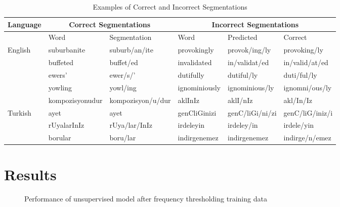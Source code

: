 \documentclass[11pt,twocolumn]{article}
\newcommand\engsmallw{2514}
\newcommand\engmedw{48146}
\newcommand\englargew{126537}
\newcommand\tursmallw{1592}
\newcommand\turmedw{14909}
\newcommand\turlargew{89023}
\begin{document}
\begin{table*}
    \begin{center}
        \begin{tabular}{ | l | l | l | l | l | l |}
            \hline
            Language & \multicolumn{2}{|c|}{\textbf{Correct Segmentations}} & \multicolumn{3}{|c|}{\textbf{Incorrect Segmentations}}\\ \hline
                     & Word & Segmentation & Word & Predicted & Correct\\ \hline
            English & suburbanite & suburb/an/ite & provokingly & provok/ing/ly & provoking/ly  \\ 
                    & buffeted & buffet/ed & invalidated  & in/validat/ed & in/valid/at/ed \\ 
                    & ewers' &  ewer/s/' & dutifully & dutiful/ly & duti/ful/ly\\ 
                    & yowling & yowl/ing & ignominiously & ignominious/ly& ignomni/ous/ly \\ 
            \hline
                    & kompozisyonudur & kompozisyon/u/dur & aklInIz & aklI/nIz & akl/In/Iz\\ 
            Turkish & ayet & ayet & genCliGinizi & genC/liGi/ni/zi & genC/liG/iniz/i\\ 
                    & rUyalarInIz & rUya/lar/InIz & irdeleyin & irdeley/in & irdele/yin\\ 
                    & borular & boru/lar & indirgenemez & indirgenemez & indirge/n/emez\\ \hline
                \end{tabular}
        \caption{Examples of Correct and Incorrect Segmentations}
    \end{center}
\end{table*}

\section{Results}
\begin{figure}
    \label{fig:unsupervised}
    \caption{Performance of unsupervised model after frequency thresholding training data}
\end{figure}
\end{document}
